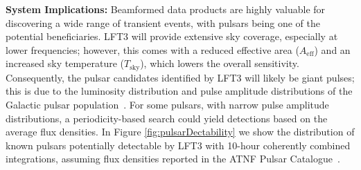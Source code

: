 


\textbf{System Implications:} Beamformed data products are highly valuable for discovering a wide range of transient events, with pulsars being one of the potential beneficiaries.  LFT3 will provide extensive sky coverage, especially at lower frequencies; however, this comes with a reduced effective area (\(A_{\text{eff}}\)) and an increased sky temperature (\(T_{\text{sky}}\)), which lowers the overall sensitivity. Consequently, the pulsar candidates identified by LFT3 will likely be giant pulses; this is due to the luminosity distribution and pulse amplitude distributions of the Galactic pulsar population~\citep{bjb+12,k13,lbb+13,zgw+24,dwl+25}. %
For some pulsars, with narrow pulse amplitude distributions, a periodicity-based search could yield detections based on the average flux densities. In Figure \ref{fig:pulsarDectability} we show the distribution of known pulsars potentially detectable by LFT3 with 10-hour coherently combined integrations, assuming flux densities reported in the ATNF Pulsar Catalogue~\citep{psrcat}.


